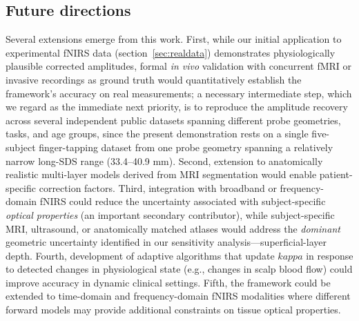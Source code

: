 \documentclass[11pt]{article}
\def\kappa{kappa}%
\def\,{ }%
\begin{document}
\subsection{Future directions}

Several extensions emerge from this work. First, while our initial application to experimental fNIRS data (section~\ref{sec:realdata}) demonstrates physiologically plausible corrected amplitudes, formal \textit{in vivo} validation with concurrent fMRI or invasive recordings as ground truth would quantitatively establish the framework's accuracy on real measurements; a necessary intermediate step, which we regard as the immediate next priority, is to reproduce the amplitude recovery across several independent public datasets spanning different probe geometries, tasks, and age groups, since the present demonstration rests on a single five-subject finger-tapping dataset from one probe geometry spanning a relatively narrow long-SDS range (33.4--40.9\,mm). Second, extension to anatomically realistic multi-layer models derived from MRI segmentation would enable patient-specific correction factors. Third, integration with broadband or frequency-domain fNIRS could reduce the uncertainty associated with subject-specific \emph{optical properties} (an important secondary contributor), while subject-specific MRI, ultrasound, or anatomically matched atlases would address the \emph{dominant} geometric uncertainty identified in our sensitivity analysis---superficial-layer depth. Fourth, development of adaptive algorithms that update $\kappa$ in response to detected changes in physiological state (e.g., changes in scalp blood flow) could improve accuracy in dynamic clinical settings. Fifth, the framework could be extended to time-domain and frequency-domain fNIRS modalities where different forward models may provide additional constraints on tissue optical properties.
\end{document}
